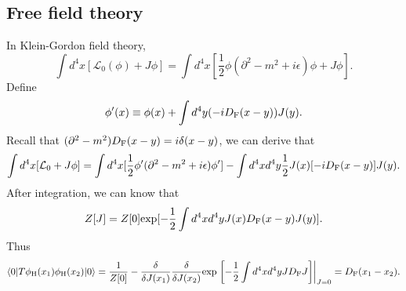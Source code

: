 \subsection{Free field theory}
\noindent
In Klein-Gordon field theory,
\[\int d^4x [\mathcal{L}_0(\phi)+J\phi] = \int d^4x [\frac{1}{2}\phi (\partial^2 -m^2+i\epsilon)\phi + J\phi].\]
Define
\[\phi'(x) \equiv \phi(x) + \int d^4y (-iD_{\rm F}(x-y)) J(y) .\]
Recall that $(\partial^2-m^2)D_{\rm F}(x-y) = i\delta(x-y)$, we can derive that
\[\int d^4x [\mathcal{L}_0+J\phi] = \int d^4x [\frac{1}{2}\phi' (\partial^2 -m^2+i\epsilon)\phi'] - \int d^4x d^4y \frac{1}{2} J(x)[-iD_{\rm F}(x-y)]J(y).\]
After integration, we can know that
\[Z[J] = Z[0] \mathrm{exp} [-\frac{1}{2} \int d^4x d^4y J(x)D_{\rm F}(x-y)J(y)].\]
Thus
\[\langle 0 | T \phi_{\rm H}(x_1) \phi_{\rm H}(x_2) | 0 \rangle =  \frac{1}{Z[0]}- \frac{\delta}{\delta J(x_1)} \frac{\delta}{\delta J(x_2)} \mathrm{exp} \left. \left[-\frac{1}{2} \int d^4x d^4y JD_{\rm F}J\right] \right |_{J=0} = D_{\rm F}(x_1-x_2).\]

